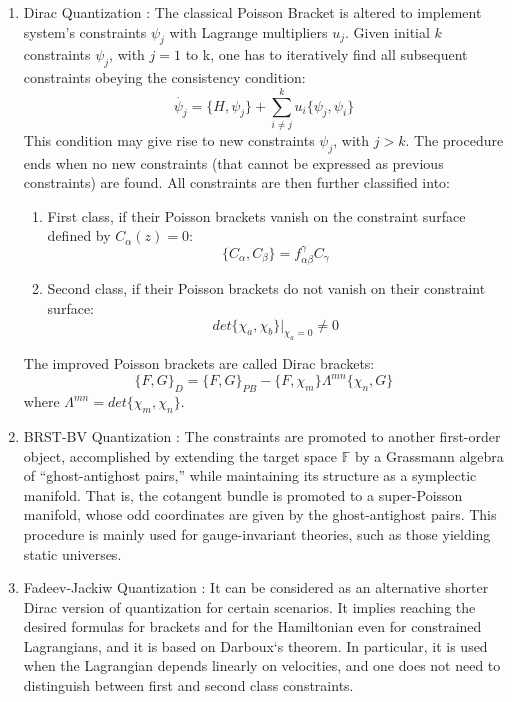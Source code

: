 \documentclass[twoside,a4paper,11pt]{article}
\numberwithin{equation}{section}
\begin{document}
\begin{enumerate}

\item 
Dirac Quantization \cite{DiracQMLectures}: The classical Poisson Bracket is altered to implement system's constraints $\psi_j$ with Lagrange multipliers $u_j$. Given initial $k$ constraints $\psi_j$, with $j = 1$ to k, one has to iteratively find all subsequent constraints obeying the consistency condition:
\begin{equation}
    \dot{\psi_j} = \{H, \psi_j \} + \sum_{i\neq j}^k u_i \{\psi_j, \psi_i \} 
\end{equation}
This condition may give rise to new constraints $\psi_j$, with $j>k$. The procedure ends when no new constraints (that cannot be expressed as previous constraints) are found. All constraints are then further classified into:
\begin{enumerate}
\item First class, if their Poisson brackets vanish on the constraint surface defined by $C_\alpha (z) = 0$:
\begin{equation}
\{ C_\alpha, C_\beta \} = f_{\alpha \beta}^\gamma C_\gamma
\end{equation}

\item Second class, if their Poisson brackets do not vanish on their constraint surface:
\begin{equation}
det\{\chi_a, \chi_b\}|_{\chi_a = 0} \neq 0
\end{equation}
\end{enumerate}
The improved Poisson brackets are called Dirac brackets:
\begin{equation}
    \{F, G\}_{D} = \{F, G \}_{PB} - \{F, \chi_m\} \Lambda^{mn}\{\chi_n, G\}
\end{equation}
where $\Lambda^{mn} = det\{\chi_m, \chi_n\}$.



\item 
BRST-BV Quantization \cite{BRSTprimer, BVformalism}: The constraints are promoted to another first-order object, accomplished by extending the target space $\mathbb{F}$ by a Grassmann algebra of “ghost-antighost pairs,” while maintaining its structure as a symplectic manifold. That is, the cotangent bundle is promoted to a super-Poisson manifold, whose odd coordinates are given by the ghost-antighost pairs. This procedure is mainly used for gauge-invariant theories, such as those yielding static universes.


\item 
Fadeev-Jackiw Quantization \cite{withouttears}: It can be considered as an alternative shorter Dirac version of quantization for certain scenarios. It implies reaching the desired formulas for brackets and for the Hamiltonian even for constrained Lagrangians, and it is based on Darboux`s theorem. In particular, it is used when the Lagrangian depends linearly on velocities, and one does not need to distinguish between first and second class constraints.

\end{enumerate}
\end{document}
